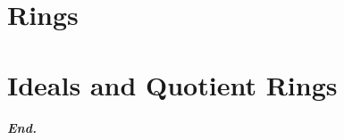\documentclass[a4paper,12pt]{report}
\begin{document}
\chapter{Rings}



\chapter{Ideals and Quotient Rings}





\vfill
\begin{center}
    \textbf{\textit{End.}}
\end{center}
\end{document}
